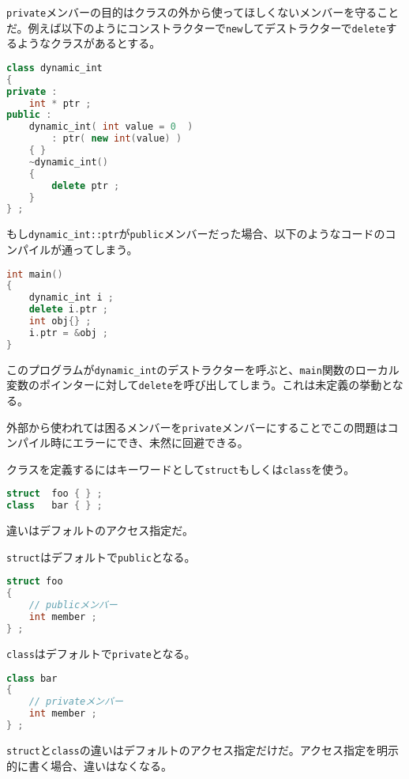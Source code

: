 \texttt{private}メンバーの目的はクラスの外から使ってほしくないメンバーを守ることだ。例えば以下のようにコンストラクターで\texttt{new}してデストラクターで\texttt{delete}するようなクラスがあるとする。

\begin{lstlisting}[language={C++}]
class dynamic_int
{
private :
    int * ptr ;
public :
    dynamic_int( int value = 0  )
        : ptr( new int(value) )
    { }
    ~dynamic_int()
    {
        delete ptr ;
    }
} ;
\end{lstlisting}

もし\texttt{dynamic\_int::ptr}が\texttt{public}メンバーだった場合、以下のようなコードのコンパイルが通ってしまう。

\begin{lstlisting}[language={C++}]
int main()
{
    dynamic_int i ;
    delete i.ptr ;
    int obj{} ;
    i.ptr = &obj ;
}
\end{lstlisting}

このプログラムが\texttt{dynamic\_int}のデストラクターを呼ぶと、\texttt{main}関数のローカル変数のポインターに対して\texttt{delete}を呼び出してしまう。これは未定義の挙動となる。

外部から使われては困るメンバーを\texttt{private}メンバーにすることでこの問題はコンパイル時にエラーにでき、未然に回避できる。

クラスを定義するにはキーワードとして\texttt{struct}もしくは\texttt{class}を使う。

\begin{lstlisting}[language={C++}]
struct  foo { } ;
class   bar { } ;
\end{lstlisting}

違いはデフォルトのアクセス指定だ。

\texttt{struct}はデフォルトで\texttt{public}となる。

\begin{lstlisting}[language={C++}]
struct foo
{
    // publicメンバー
    int member ;
} ;
\end{lstlisting}

\texttt{class}はデフォルトで\texttt{private}となる。

\begin{lstlisting}[language={C++}]
class bar
{
    // privateメンバー
    int member ;
} ;
\end{lstlisting}

\texttt{struct}と\texttt{class}の違いはデフォルトのアクセス指定だけだ。アクセス指定を明示的に書く場合、違いはなくなる。

